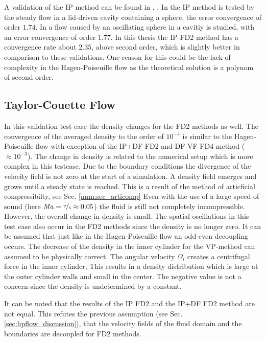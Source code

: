 A validation of the IP method can be found in \citep{Gilmanov2003}, \citep{Gilmanov2005}.
In \citep{Gilmanov2003} the IP method is tested by the steady flow in a lid-driven cavity containing a sphere, the error convergence of order $1.74$.
In  \citep{Gilmanov2005} a flow caused by an oscillating sphere in a cavitiy is studied, with an error convergence of order $1.77$.
In this thesis the IP-FD2 method has a convergence rate about $2.35$, above second order, which is slightly better in comparison to these validations.
One reason for this could be the lack of complexity in the Hagen-Poiseuille flow as the theoretical solution is a polynom of second order.


\subsection{Taylor-Couette Flow}

In this validation test case the density changes for the FD2 methods as well.
The convergence of the averaged density to the order of $10^{-4}$
is similar to the Hagen-Poiseuille flow with exception of the IP+DF FD2 and DF-VF FD4 method ($\approx10^{-3}$).
The change in density is related to the numerical setup which is more complex in this testcase.
Due to the boundary conditions the divergence of the velocity field is not zero at the start of a simulation.
A density field emerges and grows until a steady state is reached.
This is a result of the method of articficial compressibilty, see Sec. \ref{num:sec_articomp}
Even with the use of a large speed of sound (here $\operatorname{\mathit{M\kern-.10em a}}=\nicefrac{v}{c}\approx0.05$)
the fluid is still not completely incompressible. However, the overall change in density is small.
The spatial oscillations in this test case also occur in the FD2 methods since the density is no longer zero.
It can be assumed that just like in the Hagen-Poiseuille flow an odd-even decoupling occurs.
The decrease of the density in the inner cylinder for the VP-method can assumed to be physically correct.
The angular velocity $\Omega_i$ creates a centrifugal force in the inner cylinder,
This results in a density distribution which is large at the outer cylinder walls and small in the center.
The negative value is not a concern since the density is undetermined by a constant.

It can be noted that the results of the IP FD2 and the IP+DF FD2 method are not equal.
This refutes the previous assumption (see Sec. \ref{sec:hpflow_discussion}),
that the velocity fields of the fluid domain and the boundaries are decoupled for FD2 methods.

